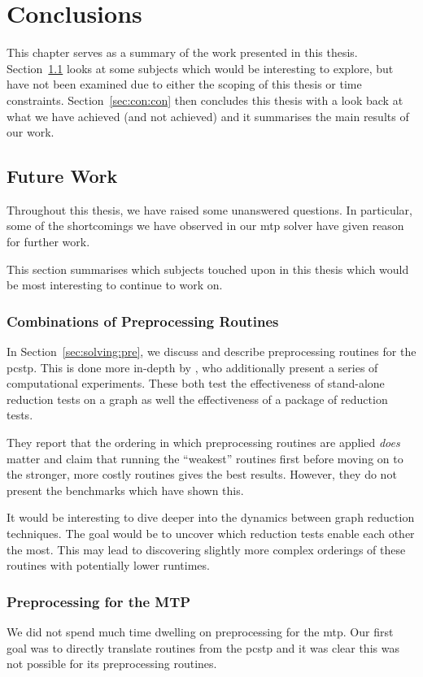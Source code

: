 
\chapter{Conclusions}
This chapter serves as a summary of the work presented in this thesis.
Section~\ref{sec:con:fut} looks at some subjects which would be
interesting to explore, but have not been examined
due to either the scoping of this thesis or
time constraints.
Section~\ref{sec:con:con} then concludes this thesis with a look back at what we
have achieved (and not achieved) and it summarises the main results of our work.

\section{Future Work}\label{sec:con:fut}
Throughout this thesis, we have raised some unanswered questions.
In particular, some of the shortcomings we have observed in our \gls{mtp}
solver have given reason for further work.

This section summarises which subjects touched upon in this thesis which would be
most interesting to continue to work on.
\subsection{Combinations of Preprocessing Routines}
In Section~\ref{sec:solving:pre}, we discuss and describe preprocessing routines for
the \gls{pcstp}. This is done more in-depth by \citet{rehfeldt2016reduction}, who
additionally present a series of computational experiments. These both test
the effectiveness of stand-alone reduction tests on a graph
as well the effectiveness of a package of reduction tests.

They report that the ordering
in which preprocessing routines are applied \textit{does} matter and claim that running
the ``weakest'' routines first before moving on to the stronger, more costly routines
gives the best results.
However, they do not present the benchmarks which have shown this.

It would be interesting to dive deeper into the dynamics between graph reduction
techniques. The goal would be to uncover which reduction tests
enable each other the most. This may lead to discovering slightly more
complex orderings of these routines with potentially lower runtimes.

\subsection{Preprocessing for the MTP}
We did not spend much time dwelling on preprocessing for the \gls{mtp}. Our first goal was
to directly translate routines from the \gls{pcstp} and it was clear this was not possible
for its preprocessing routines.

